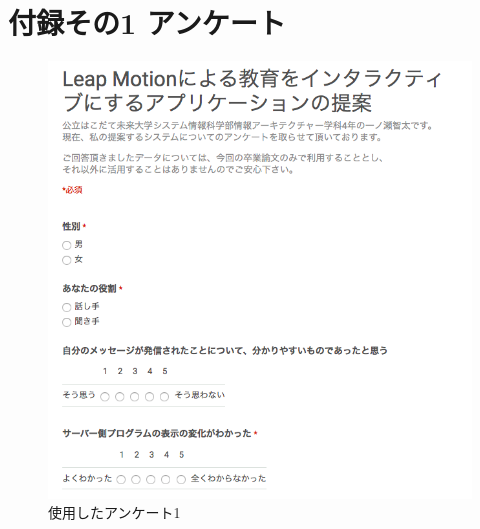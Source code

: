 \documentclass{funthesis}
\begin{document}
\appendix

\chapter*{付録その1 アンケート} %

 \begin{figure}[H]
 \begin{center}
  \includegraphics[width=120mm]{./img/ank1.png}
 \end{center}
 \caption{使用したアンケート1}
 \label{leap}
\end{figure}
\end{document}

